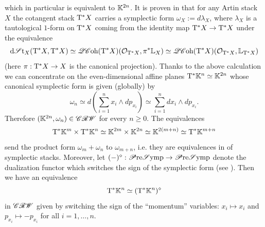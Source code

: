 which in particular is equivalent to $\mathbb{K}^{2n}$. It is proven in \cite[Theorem 2.2]{Calaque2019} that for any Artin stack $X$ the cotangent stack $\mathrm{T}^\ast X$ carries a symplectic form $\omega_X := d \lambda_X$, where $\lambda_X$ is a tautological $1$-form on $\mathrm{T}^\ast X$ coming from the identity map $\mathrm{T}^\ast X \to \mathrm{T}^\ast X$ under the equivalence
\begin{equation*}
	\mathrm{d}\mathscr{S}\mathrm{t}_X(\mathrm{T}^\ast X, \mathrm{T}^\ast X) \simeq \mathscr{QC}\mathrm{oh}(\mathrm{T}^\ast X)(\mathcal{O}_{\mathrm{T}^\ast X}, \pi^\ast \mathbb{L}_X) \simeq \mathscr{QC}\mathrm{oh}(\mathrm{T}^\ast X)(\mathcal{O}_{\mathrm{T}^\ast X}, \mathbb{L}_{\mathrm{T}^\ast X})
\end{equation*}
(here $\pi : \mathrm{T}^\ast X \to X$ is the canonical projection). Thanks to the above calculation we can concentrate on the even-dimensional affine planes $\mathrm{T}^\ast \mathbb{K}^n \simeq \mathbb{K}^{2n}$ whose canonical symplectic form is given (globally) by
\begin{equation*}
	\omega_n \simeq d \left( \sum_{i = 1}^n x_i \wedge dp_{x_i} \right) \simeq \sum_{i = 1}^n dx_i \wedge dp_{x_i}.
\end{equation*}
Therefore $(\mathbb{K}^{2n}, \omega_n) \in \mathscr{CRW}$ for every $n \geq 0$. The equivalences
\begin{equation} \label{eqn:product-of-affine-planes}
	\mathrm{T}^\ast \mathbb{K}^m \times \mathrm{T}^\ast \mathbb{K}^n \simeq \mathbb{K}^{2m} \times \mathbb{K}^{2n} \simeq \mathbb{K}^{2(m+n)} \simeq \mathrm{T}^\ast \mathbb{K}^{m+n}
\end{equation}
send the product form $\omega_m + \omega_n$ to $\omega_{m+n}$, i.e. they are equivalences in of symplectic stacks. Moreover, let $(-)^\diamond : \mathscr{P}\mathrm{re}\mathscr{S}\mathrm{ymp} \to \mathscr{P}\mathrm{re}\mathscr{S}\mathrm{ymp}$ denote the dualization functor which switches the sign of the symplectic form (see ). Then we have an equivalence
\begin{equation} \label{eqn:cotangent-complex-self-dual}
	\mathrm{T}^\ast \mathbb{K}^n \simeq (\mathrm{T}^\ast \mathbb{K}^n)^\diamond
\end{equation}
in $\mathscr{CRW}$ given by switching the sign of the ``momentum'' variables: $x_i \mapsto x_i$ and $p_{x_i} \mapsto - p_{x_i}$ for all $i = 1, \dotsc, n$.
